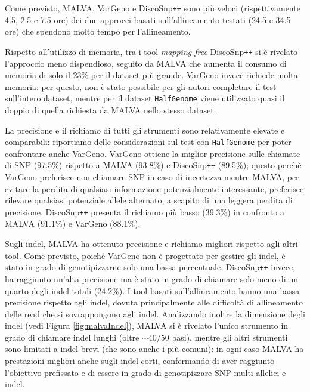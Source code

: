 \documentclass[../main.tex]{subfiles}
\begin{document}
\noindent
Come previsto, MALVA, VarGeno e DiscoSnp\texttt{++} sono più veloci (rispettivamente 4.5, 2.5 e 7.5 ore) dei due approcci basati sull'allineamento testati (24.5 e 34.5 ore) che spendono molto tempo per l'allineamento.

Rispetto all'utilizzo di memoria, tra i tool \textit{mapping-free} DiscoSnp\texttt{++} si è rivelato l'approccio meno dispendioso, seguito da MALVA che aumenta il consumo di memoria di solo il 23\% per il dataset più grande. VarGeno invece richiede molta memoria: per questo, non è stato possibile per gli autori completare il test sull'intero dataset, mentre per il dataset \texttt{HalfGenome} viene utilizzato quasi il doppio di quella richiesta da MALVA nello stesso dataset.


La precisione e il richiamo di tutti gli strumenti sono relativamente elevate e comparabili: riportiamo delle considerazioni sul test con \texttt{HalfGenome} per poter confrontare anche VarGeno. VarGeno ottiene la miglior precisione sulle chiamate di SNP (97.5\%) rispetto a MALVA (93.8\%) e DiscoSnp\texttt{++} (89.5\%); questo perchè VarGeno preferisce non chiamare SNP in caso di incertezza mentre MALVA, per evitare la perdita di qualsiasi informazione potenzialmente interessante, preferisce rilevare qualsiasi potenziale allele alternato, a scapito di una leggera perdita di precisione. DiscoSnp\texttt{++} presenta il richiamo più basso (39.3\%) in confronto a MALVA (91.1\%) e VarGeno (88.1\%).


Sugli indel, MALVA ha ottenuto precisione e richiamo migliori rispetto agli altri tool. Come previsto, poiché VarGeno non è progettato per gestire gli indel, è stato in grado di genotipizzarne solo una bassa percentuale. DiscoSnp\texttt{++} invece, ha raggiunto un'alta precisione ma è stato in grado di chiamare solo meno di un quarto degli indel totali (24.2\%). I tool basati sull'allineamento hanno una bassa precisione rispetto agli indel, dovuta principalmente alle difficoltà di allineamento delle read che si sovrappongono agli indel. Analizzando inoltre la dimensione degli indel (vedi Figura \ref{fig:malvaIndel}), MALVA si è rivelato l'unico strumento in grado di chiamare indel lunghi (oltre $\sim$40/50 basi), mentre gli altri strumenti sono limitati a indel brevi (che sono anche i più comuni): in ogni caso MALVA ha prestazioni migliori anche sugli indel corti, confermando di aver raggiunto l'obiettivo prefissato e di essere in grado di genotipizzare SNP multi-allelici e indel.\\
\end{document}
